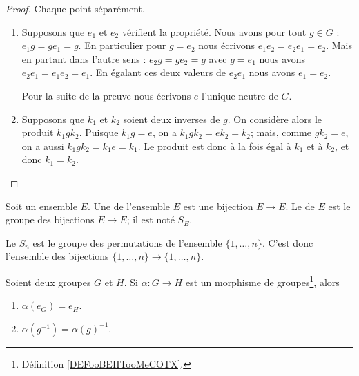 \begin{proof}
	Chaque point séparément.
	\begin{enumerate}
		\item
		      Supposons que \( e_1\) et \( e_2\) vérifient la propriété. Nous avons pour tout \( g\in G\) : \( e_1g=ge_1=g\). En particulier pour \( g=e_2\) nous écrivons \( e_1e_2=e_2e_1=e_2\). Mais en partant dans l'autre sens : \( e_2g=ge_2=g\) avec \( g=e_1\) nous avons \( e_2e_1=e_1e_2=e_1\). En égalant ces deux valeurs de \( e_2e_1\) nous avons \( e_1=e_2\).

		      Pour la suite de la preuve nous écrivons \( e\) l'unique neutre de \( G\).

		\item
		      Supposons que \( k_1\) et \( k_2\) soient deux inverses de \( g\). On considère alors le produit \( k_1 g k_2 \). Puisque \(k_1 g = e \), on a \( k_1 g k_2 = e k_2 = k_2 \); mais, comme \(g k_2 = e \), on a aussi \( k_1 g k_2 = k_1 e = k_1 \). Le produit est donc à la fois égal à \( k_1 \) et à \( k_2 \), et donc \( k_1 = k_2 \).
	\end{enumerate}
\end{proof}


\begin{definition}      \label{DEFooJNPIooMuzIXd}
	Soit un ensemble \( E\). Une  de l'ensemble \( E\) est une bijection \( E\to E\). Le  de \( E\) est le groupe des bijections \( E\to E\); il est noté \( S_E\).

	Le  \( S_n\) est le groupe des permutations de l'ensemble \( \{ 1,\ldots,n \}\). C'est donc l'ensemble des bijections \( \{ 1,\ldots, n \}\to\{ 1,\ldots, n \}\).
\end{definition}


\begin{lemma}       \label{LEMooWYLRooNOdZnp}
	Soient deux groupes \( G\) et \( H\). Si \( \alpha\colon G\to H\) est un morphisme de groupes\footnote{Définition \ref{DEFooBEHTooMeCOTX}.}, alors
	\begin{enumerate}
		\item
		      \( \alpha(e_G)=e_H\).
		\item
		      \( \alpha(g^{-1})=\alpha(g)^{-1}\).
	\end{enumerate}
\end{lemma}


